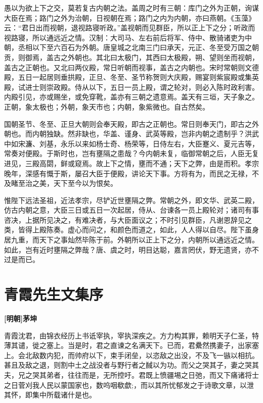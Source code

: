 \documentclass[UTF8,titlepage,oneside]{ctexbook}
\begin{document}
愚以为欲上下之交，莫若复古内朝之法。盖周之时有三朝：库门之外为正朝，询谋大臣在焉；路门之外为治朝，日视朝在焉；路门之内为内朝，亦曰燕朝。《玉藻》云：“君日出而视朝，退视路寝听政。”盖视朝而见群臣，所以正上下之分；听政而视路寝，所以通远近之情。汉制：大司马、左右前后将军、侍中、散骑诸吏为中朝，丞相以下至六百石为外朝。唐皇城之北南三门曰承天，元正、冬至受万国之朝贡，则御焉，盖古之外朝也。其北曰太极门，其西曰太极殿，朔、望则坐而视朝，盖古之正朝也。又北曰两仪殿，常日听朝而视事，盖古之内朝也。宋时常朝则文德殿，五日一起居则垂拱殿，正旦、冬至、圣节称贺则大庆殿，赐宴则紫宸殿或集英殿，试进士则崇政殿。侍从以下，五日一员上殿，谓之轮对，则必入陈时政利害。内殿引见，亦或赐坐，或免穿靴，盖亦有三朝之遗意焉。盖天有三垣，天子象之。正朝，象太极也；外朝，象天市也；内朝，象紫微也。自古然矣。

国朝圣节、冬至、正旦大朝则会奉天殿，即古之正朝也。常日则奉天门，即古之外朝也。而内朝独缺。然非缺也，华盖、谨身、武英等殿，岂非内朝之遗制乎？洪武中如宋濂、刘基，永乐以来如杨士奇、杨荣等，日侍左右，大臣蹇义、夏元吉等，常奏对便殿。于斯时也，岂有壅隔之患哉？今内朝未复，临御常朝之后，人臣无复进见，三殿高閟，鲜或窥焉。故上下之情，壅而不通；天下之弊，由是而积。孝宗晚年，深感有慨于斯，屡召大臣于便殿，讲论天下事。方将有为，而民之无禄，不及睹至治之美，天下至今以为恨矣。

惟陛下远法圣祖，近法孝宗，尽铲近世壅隔之弊。常朝之外，即文华、武英二殿，仿古内朝之意，大臣三日或五日一次起居，侍从、台谏各一员上殿轮对；诸司有事咨决，上据所见决之，有难决者，与大臣面议之；不时引见群臣，凡谢恩辞见之类，皆得上殿陈奏。虚心而问之，和颜色而道之，如此，人人得以自尽。陛下虽身居九重，而天下之事灿然毕陈于前。外朝所以正上下之分，内朝所以通远近之情。如此，岂有近时壅隔之弊哉？唐、虞之时，明目达聪，嘉言罔伏，野无遗贤，亦不过是而已。


\chapter*{青霞先生文集序}
\begin{center}
	\textbf{[明朝]茅坤}
\end{center}

青霞沈君，由锦衣经历上书诋宰执，宰执深疾之。方力构其罪，赖明天子仁圣，特薄其谴，徙之塞上。当是时，君之直谏之名满天下。已而，君纍然携妻子，出家塞上。会北敌数内犯，而帅府以下，束手闭垒，以恣敌之出没，不及飞一镞以相抗。甚且及敌之退，则割中土之战没者与野行者之馘以为功。而父之哭其子，妻之哭其夫，兄之哭其弟者，往往而是，无所控吁。君既上愤疆埸之日弛，而又下痛诸将士之日菅刈我人民以蒙国家也，数呜咽欷歔;，而以其所忧郁发之于诗歌文章，以泄其怀，即集中所载诸什是也。
\end{document}
